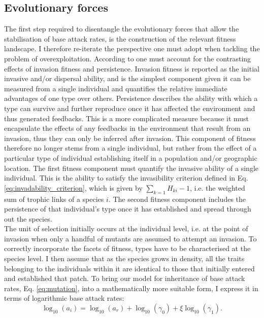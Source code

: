 \documentclass[a4paper]{report}
\DeclareMathOperator{\log}{log}
\begin{document}
\subsection{Evolutionary forces}
\label{sec:evolutionary-forces}

The first step required to disentangle the evolutionary forces that allow the stabilisation of base attack rates, is the construction of the relevant fitness landscape. I therefore re-iterate the perspective one must adopt when tackling the problem of overexploitation. According to \citep{Goodnight2008} one must account for the contrasting effects of invasion fitness and persistence. Invasion fitness is reported as the initial invasive and/or dispersal ability, and is the simplest component given it can be measured from a single individual and quantifies the relative immediate advantages of one type over others. Persistence describes the ability with which a type can survive and further reproduce once it has affected the environment and thus generated feedbacks. This is a more complicated measure because it must encapsulate the effects of any feedbacks in the environment that result from an invasion, thus they can only be inferred after invasion. This component of fitness therefore no longer stems from a single individual, but rather from the effect of a particular type of individual establishing itself in a population and/or geographic location. The first fitness component must quantify the invasive ability of a single individual. This is the ability to satisfy the invasibility criterion defined in Eq. \eqref{eq:invadability_criterion}, which is given by $\sum_{k=1} H_{ki} -1 $, i.e. the weighted sum of trophic links of a species $i$. The second fitness component includes the persistence of that individual's type once it has established and spread through out the species.\\

The unit of selection initially occurs at the individual level, i.e. at the point of invasion when only a handful of mutants are assumed to attempt an invasion. To correctly incorporate the facets of fitness, types have to be characterised at the species level. I then assume that as the species grows in density, all the traits belonging to the individuals within it are identical to those that initially entered and established that patch. To
bring our model for inheritance of base attack rates,
Eq. \eqref{eq:mutation}, into a mathematically more suitable form, I
express it in terms of logarithmic base attack rates:
\begin{equation}
  \log_{10}(a_{i})=\log_{10}(a_r) + \log_{10}(\gamma_{0}) + {\xi} \log_{10}( \gamma_{1}).\label{eq:log-mutation}
\end{equation}
\end{document}
